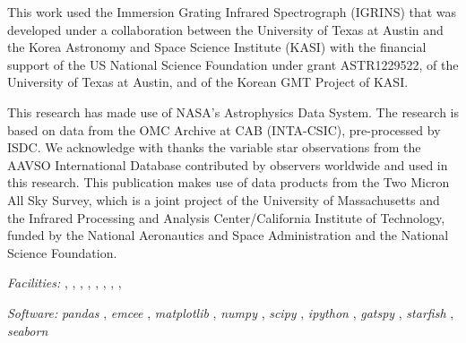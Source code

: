 \documentclass[twocolumn]{emulateapj}%
\newcommand{\project}[1]{\textsl{#1}}
\begin{document}
This work used the Immersion Grating Infrared Spectrograph (IGRINS) that was developed under a collaboration between the University of Texas at Austin and the Korea Astronomy and Space Science Institute (KASI) with the financial support of the US National Science Foundation under grant ASTR1229522, of the University of Texas at Austin, and of the Korean GMT Project of KASI.

This research has made use of NASA's Astrophysics Data System.  The research is based on data from the OMC Archive at CAB (INTA-CSIC), pre-processed by ISDC.
We acknowledge with thanks the variable star observations from the AAVSO International Database contributed by observers worldwide and used in this research.
This publication makes use of data products from the Two Micron All Sky Survey, which is a joint project of the University of Massachusetts and the Infrared Processing and Analysis Center/California Institute of Technology, funded by the National Aeronautics and Space Administration and the National Science Foundation.


{\it Facilities:} , , , , , , , , 

{\it Software: } 
 \project{pandas} \citep{mckinney10},
 \project{emcee} \citep{foreman13},
 \project{matplotlib} \citep{hunter07},
 \project{numpy} \citep{vanderwalt11},
 \project{scipy} \citep{jones01},
 \project{ipython} \citep{perez07},
 \project{gatspy} \citep{JakeVanderplas2015},
 \project{starfish} \citep{czekala15},
 \project{seaborn} \citep{waskom14}

\clearpage



\end{document}
